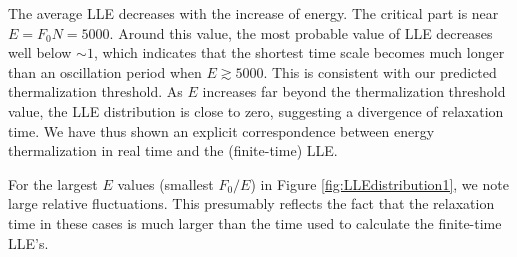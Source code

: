 \documentclass[a4paper, onecolumn]{revtex4-1}
\begin{document}




The average LLE decreases with the increase of energy. The critical part is near $E = F_0N = 5000$.
Around this value, the most probable value of LLE decreases well below $\sim1$, which indicates that
the shortest time scale becomes much longer than an oscillation period when $E\gtrsim5000$.  This is
consistent with our predicted thermalization threshold.  As $E$ increases far beyond the
thermalization threshold value, the LLE distribution is close to zero, suggesting a divergence of
relaxation time.
%
We have thus shown an explicit correspondence between energy thermalization in real time and the
(finite-time) LLE.

For the largest $E$ values (smallest $F_0/E$) in Figure \ref{fig:LLEdistribution1}, we note large
relative fluctuations.  This presumably reflects the fact that the relaxation time in these cases is
much larger than the time used to calculate the finite-time LLE's.
\end{document}
